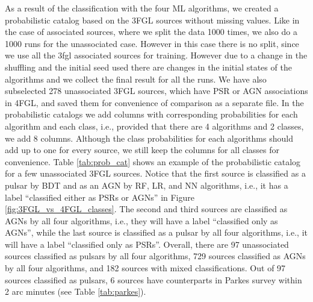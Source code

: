 As a result of the classification with the four ML algorithms,
we created a probabilistic catalog based on the 3FGL sources without missing values. Like in the case of associated sources, where we split the data 1000 times, we also do a 1000 runs for the unassociated case. However in this case there is no split, since we use all the 3fgl associated sources for training. However due to a change in the shuffling and the initial seed used there are changes in  the initial states of the algorithms and we collect the final result for all the runs.
We have also subselected 278 unassociated 3FGL sources, which have PSR or AGN associations in 4FGL,
and saved them for convenience of comparison as a separate file.
In the probabilistic catalogs we add columns with corresponding probabilities for each algorithm and each class,
i.e., provided that there are 4 algorithms and 2 classes, we add 8 columns.
Although the class probabilities for each algorithms should add up to one for every source, we still keep the columns for all classes for convenience.
Table \ref{tab:prob_cat} shows an example of the probabilistic catalog for a few unassociated 3FGL sources.
Notice that the first source is classified as a pulsar by BDT and as an AGN by RF, LR, and NN algorithms,
i.e., it has a label ``classified either as PSRs or AGNs'' in Figure \ref{fig:3FGL_vs_4FGL_classes}.
The second and third sources are classified as AGNs by all four algorithms, i.e., they will have a label
``classified only as AGNs'',
while the last source is classified as a pulsar by all four algorithms, i.e., it will have a label
``classified only as PSRs''.
Overall, there are 97 unassociated sources classified as pulsars by all four algorithms, 729 sources classified as AGNs by all four algorithms, and 182 sources with mixed classifications.
Out of 97 sources classified as pulsars, 6 sources have counterparts in Parkes survey \cite{Camilo2015} within 2 arc minutes (see Table \ref{tab:parkes}).

